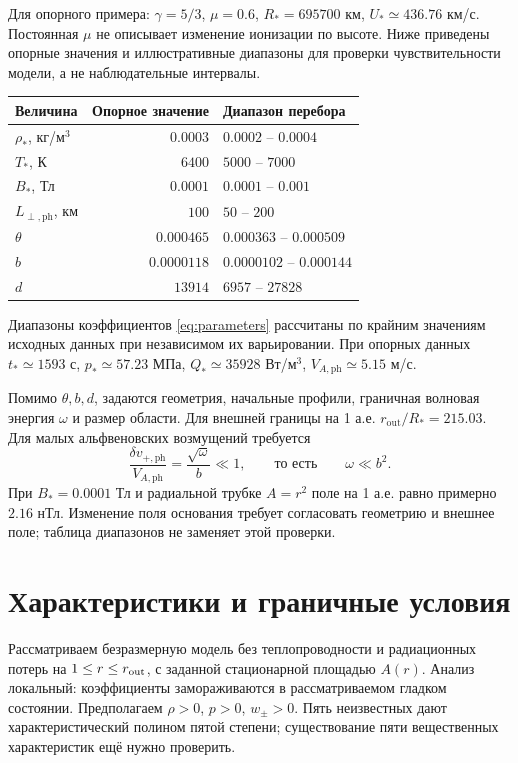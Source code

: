 \documentclass[11pt,a4paper]{article}
\newcommand{\ph}{\mathrm{ph}}
\begin{document}
Для опорного примера: $\gamma=5/3$, $\mu=0.6$,
$R_*=695700$ км, $U_*\simeq436.76$ км/с.
Постоянная $\mu$ не описывает изменение ионизации по высоте.
Ниже приведены опорные значения и иллюстративные диапазоны
для проверки чувствительности модели, а не наблюдательные интервалы.
\begin{center}
\small
\setlength{\tabcolsep}{9pt}
\begin{tabular}{@{}lrl@{}}
\toprule
Величина & Опорное значение & Диапазон перебора\\
\midrule
$\rho_*$, кг/м$^3$ & $0.0003$ & $0.0002$ -- $0.0004$\\
$T_*$, К & $6400$ & $5000$ -- $7000$\\
$B_*$, Тл & $0.0001$ & $0.0001$ -- $0.001$\\
$L_{\perp,\ph}$, км & $100$ & $50$ -- $200$\\
\midrule
$\theta$ & $0.000465$ & $0.000363$ -- $0.000509$\\
$b$ & $0.0000118$ & $0.0000102$ -- $0.000144$\\
$d$ & $13914$ & $6957$ -- $27828$\\
\bottomrule
\end{tabular}
\end{center}
Диапазоны коэффициентов \eqref{eq:parameters} рассчитаны по крайним
значениям исходных данных при независимом их варьировании.
При опорных данных $t_*\simeq1593$ с,
$p_*\simeq57.23$ МПа, $Q_*\simeq35928$ Вт/м$^3$,
$V_{A,\ph}\simeq5.15$ м/с.

Помимо $\theta,b,d$, задаются геометрия, начальные профили,
граничная волновая энергия $\omega$ и размер области.
Для внешней границы на 1 а.е. $r_{\mathrm{out}}/R_*=215.03$.
Для малых альфвеновских возмущений требуется
\[
 \frac{\delta v_{+,\ph}}{V_{A,\ph}}=\frac{\sqrt\omega}{b}\ll1,
 \qquad\text{то есть}\qquad \omega\ll b^2.
\]
При $B_*=0.0001$ Тл и радиальной трубке $A=r^2$ поле на 1 а.е.
равно примерно $2.16$ нТл. Изменение поля основания требует
согласовать геометрию и внешнее поле; таблица диапазонов
не заменяет этой проверки.

\newpage
\section{Характеристики и граничные условия}

Рассматриваем безразмерную модель без теплопроводности и радиационных
потерь на $1\le r\le r_{\rm out}$, с заданной стационарной площадью $A(r)$.
Анализ локальный: коэффициенты замораживаются в рассматриваемом
гладком состоянии. Предполагаем $\rho>0$, $p>0$, $w_\pm>0$. Пять неизвестных дают характеристический полином пятой степени;
существование пяти вещественных характеристик ещё нужно проверить.
\end{document}
